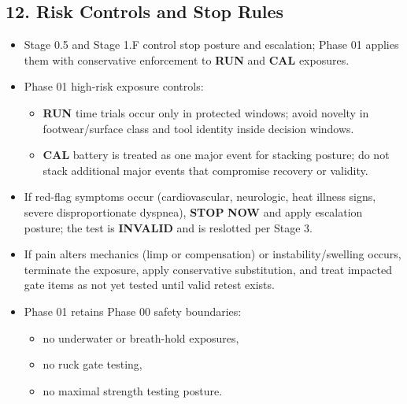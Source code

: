 \documentclass[10pt]{article}
\begin{document}
\subsection*{12. Risk Controls and Stop Rules}

\begin{itemize}
\item Stage 0.5 and Stage 1.F control stop posture and escalation; Phase 01 applies them with conservative enforcement to \textbf{RUN} and \textbf{CAL} exposures.
\item Phase 01 high-risk exposure controls:
\begin{itemize}
\item \textbf{RUN} time trials occur only in protected windows; avoid novelty in footwear/surface class and tool identity inside decision windows.
\item \textbf{CAL} battery is treated as one major event for stacking posture; do not stack additional major events that compromise recovery or validity.
\end{itemize}
\item If red-flag symptoms occur (cardiovascular, neurologic, heat illness signs, severe disproportionate dyspnea), \textbf{STOP} \textbf{NOW} and apply escalation posture; the test is \textbf{INVALID} and is reslotted per Stage 3.
\item If pain alters mechanics (limp or compensation) or instability/swelling occurs, terminate the exposure, apply conservative substitution, and treat impacted gate items as not yet tested until valid retest exists.
\item Phase 01 retains Phase 00 safety boundaries:
\begin{itemize}
\item no underwater or breath-hold exposures,
\item no ruck gate testing,
\item no maximal strength testing posture.
\end{itemize}
\end{itemize}
\end{document}
